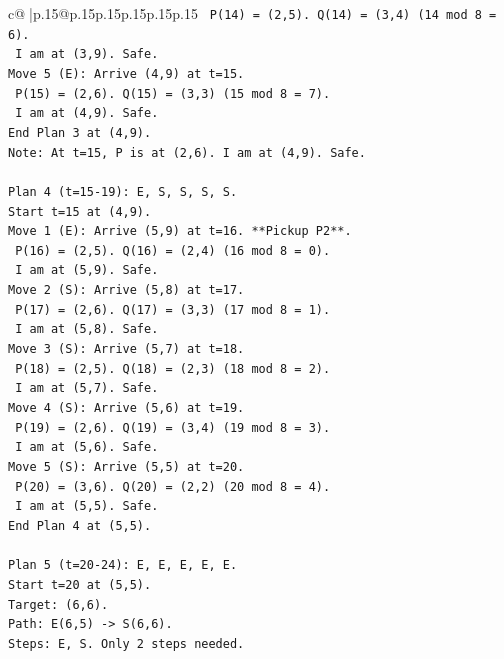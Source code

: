 \documentclass{article}
\begin{document}
{\begin{supertabular}{c@{$\;$}|p{.15\linewidth}@{}p{.15\linewidth}p{.15\linewidth}p{.15\linewidth}p{.15\linewidth}p{.15\linewidth}}
{{{\texttt{  P(14) = (2,5). Q(14) = (3,4) (14 mod 8 = 6).} \\
\texttt{  I am at (3,9). Safe.} \\
\texttt{Move 5 (E): Arrive (4,9) at t=15.} \\
\texttt{  P(15) = (2,6). Q(15) = (3,3) (15 mod 8 = 7).} \\
\texttt{  I am at (4,9). Safe.} \\
\texttt{End Plan 3 at (4,9).} \\
\texttt{Note: At t=15, P is at (2,6). I am at (4,9). Safe.} \\
\\ 
\texttt{Plan 4 (t=15{-}19): E, S, S, S, S.} \\
\texttt{Start t=15 at (4,9).} \\
\texttt{Move 1 (E): Arrive (5,9) at t=16. **Pickup P2**.} \\
\texttt{  P(16) = (2,5). Q(16) = (2,4) (16 mod 8 = 0).} \\
\texttt{  I am at (5,9). Safe.} \\
\texttt{Move 2 (S): Arrive (5,8) at t=17.} \\
\texttt{  P(17) = (2,6). Q(17) = (3,3) (17 mod 8 = 1).} \\
\texttt{  I am at (5,8). Safe.} \\
\texttt{Move 3 (S): Arrive (5,7) at t=18.} \\
\texttt{  P(18) = (2,5). Q(18) = (2,3) (18 mod 8 = 2).} \\
\texttt{  I am at (5,7). Safe.} \\
\texttt{Move 4 (S): Arrive (5,6) at t=19.} \\
\texttt{  P(19) = (2,6). Q(19) = (3,4) (19 mod 8 = 3).} \\
\texttt{  I am at (5,6). Safe.} \\
\texttt{Move 5 (S): Arrive (5,5) at t=20.} \\
\texttt{  P(20) = (3,6). Q(20) = (2,2) (20 mod 8 = 4).} \\
\texttt{  I am at (5,5). Safe.} \\
\texttt{End Plan 4 at (5,5).} \\
\\ 
\texttt{Plan 5 (t=20{-}24): E, E, E, E, E.} \\
\texttt{Start t=20 at (5,5).} \\
\texttt{Target: (6,6).} \\
\texttt{Path: E(6,5) {-}> S(6,6).} \\
\texttt{Steps: E, S. Only 2 steps needed.} \\
}}}
\end{supertabular}}
\end{document}
